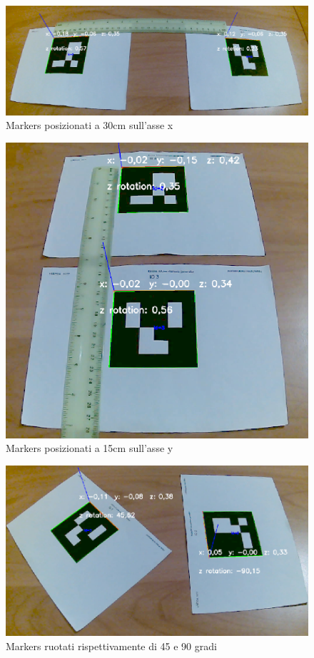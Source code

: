 \documentclass[12pt,a4paper,openright,twoside]{book}
\begin{document}
\begin{figure}[h!]
	\centering
	\includegraphics[width=0.6\linewidth]{./figures/Valutazione/markers_x.png}
	\caption{Markers posizionati a 30cm sull'asse x}
	\label{fig:markers_x}
\end{figure}
\begin{figure}[h!]
	\centering
	\includegraphics[width=0.6\linewidth]{./figures/Valutazione/markers_y.png}
	\caption{Markers posizionati a 15cm sull'asse y}
	\label{fig:markers_y}
\end{figure}
\begin{figure}[h!]
	\centering
	\includegraphics[width=0.6\linewidth]{./figures/Valutazione/markers_rotate.png}
	\caption{Markers ruotati rispettivamente di 45 e 90 gradi}
	\label{fig:markers_rotate}
\end{figure}

\newpage
\end{document}
